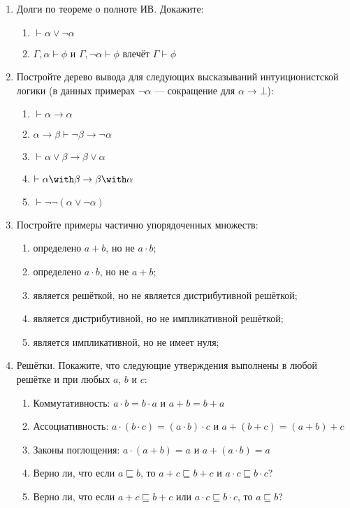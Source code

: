 \documentclass[10pt,a4paper,oneside]{article}
\begin{document}
\begin{enumerate}
\item Долги по теореме о полноте ИВ. Докажите:
\begin{enumerate}
\item $\vdash \alpha\vee\neg\alpha$
\item $\Gamma,\alpha \vdash \phi$ и $\Gamma,\neg\alpha\vdash\phi$ влечёт $\Gamma\vdash\phi$
\end{enumerate}

\item Постройте дерево вывода для следующих высказываний интуиционистской логики
(в данных примерах $\neg\alpha$ --- сокращение для $\alpha\rightarrow\bot$):

\begin{enumerate}
\item $\vdash\alpha\rightarrow\alpha$
\item $\alpha\rightarrow\beta\vdash\neg\beta\rightarrow\neg\alpha$
\item $\vdash\alpha\vee\beta\rightarrow\beta\vee\alpha$
\item $\vdash\alpha\with\beta\rightarrow\beta\with\alpha$
\item $\vdash\neg\neg(\alpha\vee\neg\alpha)$
\end{enumerate}

\item Постройте примеры частично упорядоченных множеств:
\begin{enumerate}
\item определено $a + b$, но не $a \cdot b$;
\item определено $a \cdot b$, но не $a + b$;
\item является решёткой, но не является дистрибутивной решёткой;
\item является дистрибутивной, но не импликативной решёткой;
\item является импликативной, но не имеет нуля;
\end{enumerate}

\item Решётки. Покажите, что следующие утверждения выполнены в любой решётке и
при любых $a$, $b$ и $c$:

\begin{enumerate}
\item Коммутативность: $a \cdot b = b \cdot a$ и $a + b = b + a$
\item Ассоциативность: $a \cdot (b \cdot c) = (a \cdot b) \cdot c$ и $a + (b + c) = (a + b) + c$
\item Законы поглощения: $a \cdot (a + b) = a$ и $a + (a \cdot b) = a$
\item Верно ли, что если $a \sqsubseteq b$, то $a + c \sqsubseteq b + c$ и $a \cdot c \sqsubseteq b \cdot c$?
\item Верно ли, что если $a + c \sqsubseteq b + c$ или $a \cdot c \sqsubseteq b \cdot c$, то $a \sqsubseteq b$?
\end{enumerate}


\end{enumerate}
\end{document}
